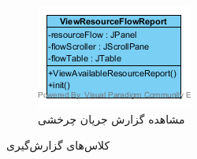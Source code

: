 \begin{figure}[H]
	\begin{subfigure}[b]{0.3\textwidth}
		\includegraphics[width=\textwidth]{img/class-design/ui/ViewResourceFlowReport.png}
		\caption{مشاهده گزارش جریان چرخشی}
	\end{subfigure}
	\caption{کلاس‌های گزارش‌گیری}
\end{figure}

